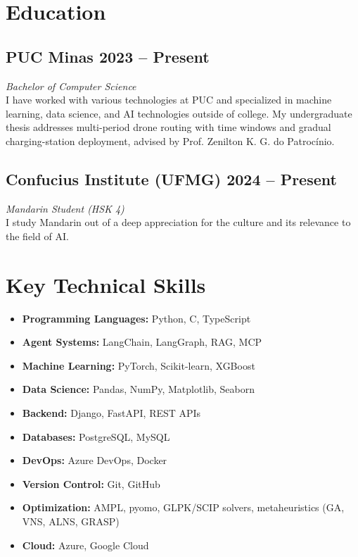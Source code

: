 \documentclass[a4paper,10pt]{article}
\begin{document}
\section*{ Education}

\subsection*{PUC Minas \hfill 2023 -- Present}
\textit{Bachelor of Computer Science} \\
I have worked with various technologies at PUC and specialized in machine learning, data science, and AI technologies outside of college. My undergraduate thesis addresses multi-period drone routing with time windows and gradual charging-station deployment, advised by Prof. Zenilton K. G. do Patrocínio.

\subsection*{Confucius Institute (UFMG) \hfill 2024 -- Present}
\textit{Mandarin Student (HSK 4)} \\
I study Mandarin out of a deep appreciation for the culture and its relevance to the field of AI.

\section*{ Key Technical Skills}
\begin{center}
    \begin{itemize}[label=, itemsep=-3pt]
        \item \textbf{Programming Languages:} Python, C, TypeScript
        \item \textbf{Agent Systems:} LangChain, LangGraph, RAG, MCP
        \item \textbf{Machine Learning:} PyTorch, Scikit-learn, XGBoost
        \item \textbf{Data Science:} Pandas, NumPy, Matplotlib, Seaborn
        \item \textbf{Backend:} Django, FastAPI, REST APIs
        \item \textbf{Databases:} PostgreSQL, MySQL
        \item \textbf{DevOps:} Azure DevOps, Docker
        \item \textbf{Version Control:} Git, GitHub
        \item \textbf{Optimization:} AMPL, pyomo, GLPK/SCIP solvers, metaheuristics (GA, VNS, ALNS, GRASP)
        \item \textbf{Cloud:} Azure, Google Cloud

    \end{itemize}
\end{center}
\end{document}
